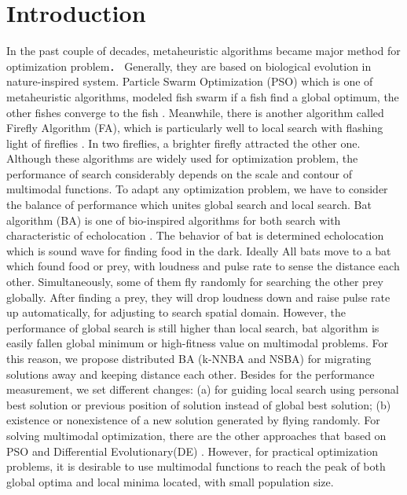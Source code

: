 
\section{Introduction}

In the past couple of decades, metaheuristic algorithms became major method for optimization problem． Generally, they are based on biological evolution in nature-inspired system. 
 Particle Swarm Optimization (PSO) which is one of metaheuristic algorithms, modeled fish swarm if a fish find a global optimum, the other fishes converge to the fish \cite{PSO01}. Meanwhile, there is another algorithm called Firefly Algorithm (FA), which is particularly well to local search with flashing light of fireflies \cite{FA01}. In two fireflies, a brighter firefly attracted the other one. Although these algorithms are widely used for optimization problem, the performance of search considerably depends on the scale and contour of multimodal functions. To adapt any optimization problem, we have to consider the balance of performance which unites global search and local search. Bat algorithm (BA) is one of bio-inspired algorithms for both search with characteristic of echolocation \cite{BA01}. The behavior of bat is determined echolocation which is sound wave for finding food in the dark. Ideally All bats move to a bat which found food or prey, with loudness and pulse rate to sense the distance each other. Simultaneously, some of them fly randomly for searching the other prey globally. After finding a prey, they will drop loudness down and raise pulse rate up automatically, for adjusting to search spatial domain. However, the performance of global search is still higher than local search, bat algorithm is easily fallen global minimum or high-fitness value on multimodal problems. For this reason, we propose distributed BA (k-NNBA and NSBA) for migrating solutions away and keeping distance each other. Besides for the performance measurement, we set different changes: (a) for guiding local search using personal best solution or previous position of solution instead of global best solution; (b) existence or nonexistence of a new solution generated by flying randomly. For solving multimodal optimization, there are the other approaches that based on
  PSO \cite{PSO4mo2}\cite{PSO4mo}and Differential Evolutionary(DE) \cite{DE4mo2}\cite{DE4mo}. However, for practical optimization problems, it is desirable to use multimodal functions to reach the peak of both global optima and local minima located, with small population size.  \\
